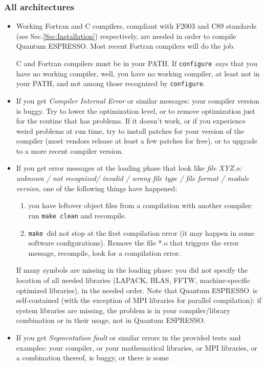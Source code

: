 \documentclass[12pt,a4paper]{article}
\def\qe{{\sc Quantum ESPRESSO}}
\def\configure{\texttt{configure}}
\def\make{\texttt{make}}
\begin{document}
\subsubsection{All architectures}
\begin{itemize}
\item
Working Fortran and C compilers, compliant with F2003 and C89 standards
(see Sec.\ref{Sec:Installation})
respectively, are needed in order to compile \qe. Most recent Fortran
compilers will do the job.

C and Fortran compilers must be in your PATH.
If \configure\ says that you have no working compiler, well,
you have no working compiler, at least not in your PATH, and
not among those recognized by \configure.
\item
If you get {\em Compiler Internal Error} or similar messages: your
compiler version is buggy. Try to lower the optimization level, or to
remove optimization just for the routine that has problems. If it
doesn't work, or if you experience weird problems at run time, try to
install patches for your version of the compiler (most vendors release
at least a few patches for free), or to upgrade to a more recent
compiler version.
\item
If you get error messages at the loading phase that look like
{\em file XYZ.o: unknown / not recognized/ invalid / wrong
file type / file format / module version},
one of the following things have happened:
\begin{enumerate}
\item you have leftover object files from a compilation with another
  compiler: run \texttt{make clean} and recompile.
\item \make\ did not stop at the first compilation error (it may
happen in some software configurations). Remove the file *.o
that triggers the error message, recompile, look for a
compilation error.
\end{enumerate}
If many symbols are missing in the loading phase: you did not specify the
location of all needed libraries (LAPACK, BLAS, FFTW, machine-specific
optimized libraries), in the needed order.
Note that \qe\ is self-contained (with the exception of MPI libraries for
parallel compilation): if system libraries are missing, the problem is in
your compiler/library combination or in their usage, not in \qe.
\item
If you get {\em Segmentation fault} or similar errors
in the provided tests and examples: your compiler, or
your mathematical libraries, or MPI libraries,
or a combination thereof, is buggy, or there is some

\end{itemize}
\end{document}
